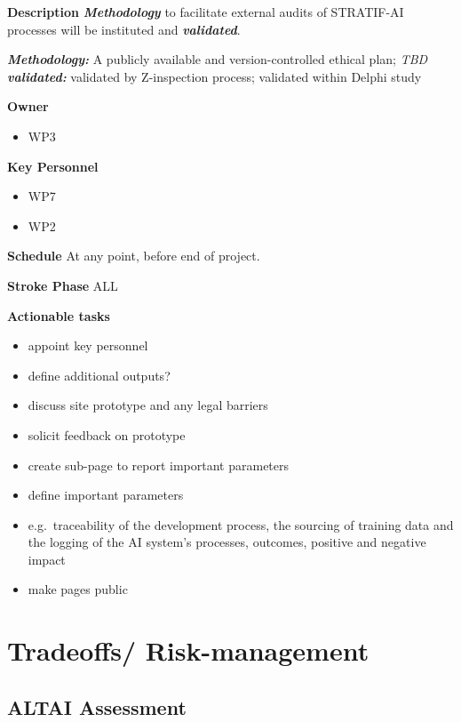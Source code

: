 \documentclass[
  letterpaper,
  DIV=11,
  numbers=noendperiod]{scrreport}
\providecommand{\tightlist}{%
  \setlength{\itemsep}{0pt}\setlength{\parskip}{0pt}}\usepackage{longtable,booktabs,array}
\begin{document}
\textbf{Description} \textbf{\emph{Methodology}} to facilitate external
audits of STRATIF-AI processes will be instituted and
\textbf{\emph{validated}}.

\textbf{\emph{Methodology:}} A publicly available and version-controlled
ethical plan; \emph{TBD}\\
\textbf{\emph{validated:}} validated by Z-inspection process; validated
within Delphi study

\textbf{Owner}

\begin{itemize}
\tightlist
\item
  WP3
\end{itemize}

\textbf{Key Personnel}

\begin{itemize}
\tightlist
\item
  WP7
\item
  WP2
\end{itemize}

\textbf{Schedule} At any point, before end of project.

\textbf{Stroke Phase} ALL

\textbf{Actionable tasks}

\begin{itemize}
\tightlist
\item
  appoint key personnel
\item
  define additional outputs?
\item
  discuss site prototype and any legal barriers
\item
  solicit feedback on prototype
\item
  create sub-page to report important parameters
\item
  define important parameters
\item
  e.g.~traceability of the development process, the sourcing of training
  data and the logging of the AI system's processes, outcomes, positive
  and negative impact
\item
  make pages public
\end{itemize}

\hypertarget{tradeoffs-risk-management}{%
\section{Tradeoffs/ Risk-management}\label{tradeoffs-risk-management}}

\hypertarget{altai-assessment-17}{%
\subsection*{ALTAI Assessment}\label{altai-assessment-17}}
\end{document}
